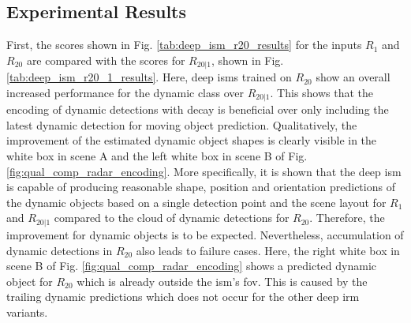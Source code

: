 \subsection{Experimental Results}
First, the scores shown in Fig. \ref{tab:deep_ism_r20_results} for the inputs $R_1$ and $R_{20}$ are compared with the scores for $R_{20|1}$, shown in Fig. \ref{tab:deep_ism_r20_1_results}. Here, deep \gls{ism}s trained on $R_{20}$ show an overall increased performance for the dynamic class over $R_{20|1}$. This shows that the encoding of dynamic detections with decay is beneficial over only including the latest dynamic detection for moving object prediction. Qualitatively, the improvement of the estimated dynamic object shapes is clearly visible in the white box in scene A and the left white box in scene B of Fig. \ref{fig:qual_comp_radar_encoding}. More specifically, it is shown that the deep \gls{ism} is capable of producing reasonable shape, position and orientation predictions of the dynamic objects based on a single detection point and the scene layout for $R_1$ and $R_{20|1}$ compared to the cloud of dynamic detections for $R_{20}$. Therefore, the improvement for dynamic objects is to be expected. Nevertheless, accumulation of dynamic detections in $R_{20}$ also leads to failure cases. Here, the right white box in scene B of Fig. \ref{fig:qual_comp_radar_encoding} shows a predicted dynamic object for $R_{20}$ which is already outside the \gls{ism}'s \gls{fov}. This is caused by the trailing dynamic predictions which does not occur for the other deep \gls{irm} variants.
